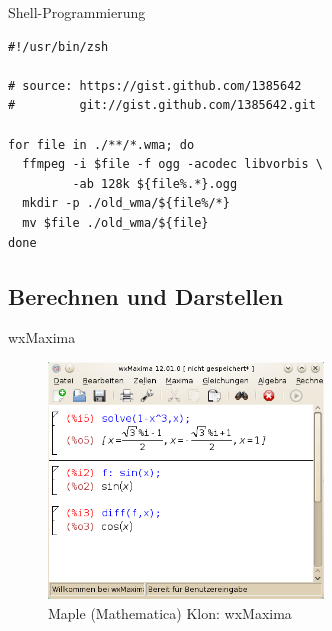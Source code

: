 \begin{frame}[fragile]{Shell-Programmierung}
  \lstset{language=bash,
          numbers=left,
          numberstyle=\tiny,
          showstringspaces=false,
          aboveskip=-40pt,
          frame=leftline
  }
  \vspace{2em}
          
  \begin{lstlisting}[caption={Beispiel zur Audio/Video Konvertierung},captionpos=b]
#!/usr/bin/zsh

# source: https://gist.github.com/1385642
#         git://gist.github.com/1385642.git

for file in ./**/*.wma; do
  ffmpeg -i $file -f ogg -acodec libvorbis \
         -ab 128k ${file%.*}.ogg
  mkdir -p ./old_wma/${file%/*}
  mv $file ./old_wma/${file}
done
   \end{lstlisting}
 
\end{frame}

\subsection{Berechnen und Darstellen}

\begin{frame}{wxMaxima}
  \begin{figure}
    \includegraphics[keepaspectratio=true,width=0.65\textwidth]{wxmaxima}
    \caption{Maple (Mathematica) Klon: wxMaxima}
  \end{figure}
\end{frame}

